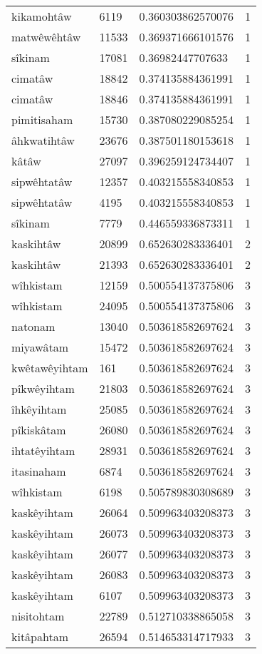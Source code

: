 \begin{longtable}{llll}
kikamohtâw & 6119 & 0.360303862570076 & 1 \\
matwêwêhtâw & 11533 & 0.369371666101576 & 1 \\
sîkinam & 17081 & 0.36982447707633 & 1 \\
cimatâw & 18842 & 0.374135884361991 & 1 \\
cimatâw & 18846 & 0.374135884361991 & 1 \\
pimitisaham & 15730 & 0.387080229085254 & 1 \\
âhkwatihtâw & 23676 & 0.387501180153618 & 1 \\
kâtâw & 27097 & 0.396259124734407 & 1 \\
sipwêhtatâw & 12357 & 0.403215558340853 & 1 \\
sipwêhtatâw & 4195 & 0.403215558340853 & 1 \\
sîkinam & 7779 & 0.446559336873311 & 1 \\
kaskihtâw & 20899 & 0.652630283336401 & 2 \\
kaskihtâw & 21393 & 0.652630283336401 & 2 \\
wîhkistam & 12159 & 0.500554137375806 & 3 \\
wîhkistam & 24095 & 0.500554137375806 & 3 \\
natonam & 13040 & 0.503618582697624 & 3 \\
miyawâtam & 15472 & 0.503618582697624 & 3 \\
kwêtawêyihtam & 161 & 0.503618582697624 & 3 \\
pîkwêyihtam & 21803 & 0.503618582697624 & 3 \\
îhkêyihtam & 25085 & 0.503618582697624 & 3 \\
pîkiskâtam & 26080 & 0.503618582697624 & 3 \\
ihtatêyihtam & 28931 & 0.503618582697624 & 3 \\
itasinaham & 6874 & 0.503618582697624 & 3 \\
wîhkistam & 6198 & 0.505789830308689 & 3 \\
kaskêyihtam & 26064 & 0.509963403208373 & 3 \\
kaskêyihtam & 26073 & 0.509963403208373 & 3 \\
kaskêyihtam & 26077 & 0.509963403208373 & 3 \\
kaskêyihtam & 26083 & 0.509963403208373 & 3 \\
kaskêyihtam & 6107 & 0.509963403208373 & 3 \\
nisitohtam & 22789 & 0.512710338865058 & 3 \\
kitâpahtam & 26594 & 0.514653314717933 & 3 \\

\end{longtable}
